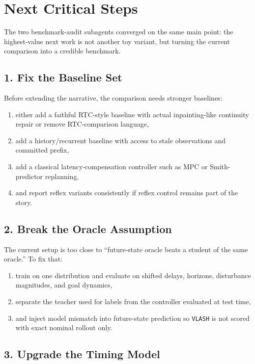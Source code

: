 \documentclass[11pt]{article}
\begin{document}
\section{Next Critical Steps}

The two benchmark-audit subagents converged on the same main point: the highest-value next work is not another toy variant, but turning the current comparison into a credible benchmark.

\subsection{1. Fix the Baseline Set}

Before extending the narrative, the comparison needs stronger baselines:
\begin{enumerate}[leftmargin=1.5em]
  \item either add a faithful RTC-style baseline with actual inpainting-like continuity repair or remove RTC-comparison language,
  \item add a history/recurrent baseline with access to stale observations and committed prefix,
  \item add a classical latency-compensation controller such as MPC or Smith-predictor replanning,
  \item and report reflex variants consistently if reflex control remains part of the story.
\end{enumerate}

\subsection{2. Break the Oracle Assumption}

The current setup is too close to ``future-state oracle beats a student of the same oracle.'' To fix that:
\begin{enumerate}[leftmargin=1.5em]
  \item train on one distribution and evaluate on shifted delays, horizons, disturbance magnitudes, and goal dynamics,
  \item separate the teacher used for labels from the controller evaluated at test time,
  \item and inject model mismatch into future-state prediction so \texttt{VLASH} is not scored with exact nominal rollout only.
\end{enumerate}

\subsection{3. Upgrade the Timing Model}
\end{document}
